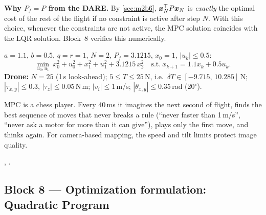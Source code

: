 \textbf{Why $P_f=P$ from the DARE.} By \cref{sec:m2b6}, $\bm{x}_N^\top P\bm{x}_N$ is \emph{exactly} the optimal cost of
the rest of the flight if no constraint is active after step $N$. With this choice, whenever the constraints are not
active, the MPC solution coincides with the LQR solution. Block~8 verifies this numerically.

\begin{toybox}
$a=1.1$, $b=0.5$, $q=r=1$, $N=2$, $P_f=3.1215$, $x_0=1$, $|u_k|\le0.5$:
\[
  \min_{u_0,u_1}\ x_0^2+u_0^2+x_1^2+u_1^2+3.1215\,x_2^2\quad\text{s.t.}\ x_{k+1}=1.1x_k+0.5u_k .
\]
\textbf{Drone:} $N=25$ (1\,s look-ahead); $5\le T\le25$\,N, i.e.\ $\delta T\in[-9.715,\,10.285]$\,N; $|\tau_{x,y}|\le0.3$,
$|\tau_z|\le0.05$\,N\,m; $|v_i|\le1$\,m/s; $|\theta_{x,y}|\le0.35$\,rad (20$^\circ$).
\end{toybox}

\begin{projbox}
MPC is a chess player. Every 40\,ms it imagines the next second of flight, finds the best sequence of moves that never
breaks a rule (``never faster than 1\,m/s'', ``never ask a motor for more than it can give''), plays only the first move,
and thinks again. For camera-based mapping, the speed and tilt limits protect image quality.
\end{projbox}

\begin{codebox}
\intoy {}, .
\end{codebox}

\subsection{Block 8 --- Optimization formulation: Quadratic Program}
\label{sec:m2b8}

